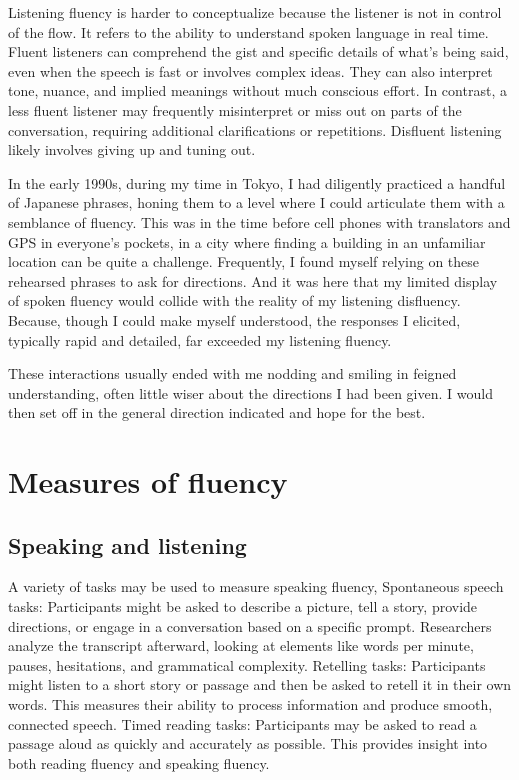 Listening fluency is harder to conceptualize because the listener is not in control of the flow. It refers to the ability to understand spoken language in real time. Fluent listeners can comprehend the gist and specific details of what's being said, even when the speech is fast or involves complex ideas. They can also interpret tone, nuance, and implied meanings without much conscious effort. In contrast, a less fluent listener may frequently misinterpret or miss out on parts of the conversation, requiring additional clarifications or repetitions. Disfluent listening likely involves giving up and tuning out.

In the early 1990s, during my time in Tokyo, I had diligently practiced a handful of Japanese phrases, honing them to a level where I could articulate them with a semblance of fluency. This was in the time before cell phones with translators and GPS in everyone's pockets, in a city where finding a building in an unfamiliar location can be quite a challenge. Frequently, I found myself relying on these rehearsed phrases to ask for directions. And it was here that my limited display of spoken fluency would collide with the reality of my listening disfluency. Because, though I could make myself understood, the responses I elicited, typically rapid and detailed, far exceeded my listening fluency.

These interactions usually ended with me nodding and smiling in feigned understanding, often little wiser about the directions I had been given. I would then set off in the general direction indicated and hope for the best.


\section{Measures of fluency}

\subsection{Speaking and listening}

A variety of tasks may be used to measure speaking fluency, Spontaneous speech tasks: Participants might be asked to describe a picture, tell a story, provide directions, or engage in a conversation based on a specific prompt. Researchers analyze the transcript afterward, looking at elements like words per minute, pauses, hesitations, and grammatical complexity.
Retelling tasks: Participants might listen to a short story or passage and then be asked to retell it in their own words. This measures their ability to process information and produce smooth, connected speech.
Timed reading tasks: Participants may be asked to read a passage aloud as quickly and accurately as possible. This provides insight into both reading fluency and speaking fluency.

